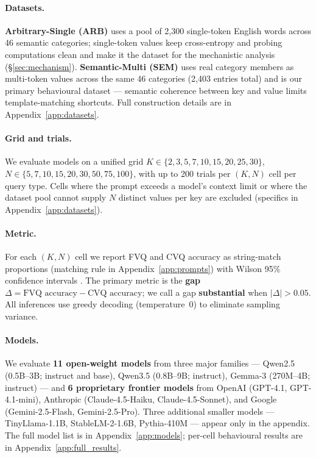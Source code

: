 \documentclass[11pt]{article}
\begin{document}
\paragraph{Datasets.}
\textbf{Arbitrary-Single (ARB)} uses a pool of 2{,}300 single-token
English words across 46 semantic categories;
single-token values keep cross-entropy and probing computations
clean and make it the dataset for the mechanistic analysis
(\S\ref{sec:mechanism}).
\textbf{Semantic-Multi (SEM)} uses real category members as
multi-token values across the same 46 categories (2{,}403 entries
total) and is our primary behavioural dataset --- semantic coherence
between key and value limits template-matching shortcuts.
Full construction details are in Appendix~\ref{app:datasets}.

\paragraph{Grid and trials.}
We evaluate models on a unified grid
$K \in \{2, 3, 5, 7, 10, 15, 20, 25, 30\}$,
$N \in \{5, 7, 10, 15, 20, 30, 50, 75, 100\}$, with up to 200 trials
per $(K, N)$ cell per query type.
Cells where the prompt exceeds a model's context limit or where the
dataset pool cannot supply $N$ distinct values per key are excluded
(specifics in Appendix~\ref{app:datasets}).

\paragraph{Metric.}
For each $(K, N)$ cell we report FVQ and CVQ accuracy as
string-match proportions (matching rule in
Appendix~\ref{app:prompts}) with Wilson 95\% confidence intervals
\citep{wilson1927}.
The primary metric is the \textbf{gap}
$\Delta = \text{FVQ accuracy} - \text{CVQ accuracy}$; we call a gap
\textbf{substantial} when $|\Delta| > 0.05$.
All inferences use greedy decoding (temperature~0) to eliminate
sampling variance.

\paragraph{Models.}
We evaluate \textbf{11 open-weight models} from three major
families --- Qwen2.5 (0.5B--3B; instruct and base), Qwen3.5
(0.8B--9B; instruct), Gemma-3 (270M--4B; instruct) --- and \textbf{6
proprietary frontier models} from OpenAI (GPT-4.1, GPT-4.1-mini),
Anthropic (Claude-4.5-Haiku, Claude-4.5-Sonnet), and Google
(Gemini-2.5-Flash, Gemini-2.5-Pro).
Three additional smaller models --- TinyLlama-1.1B, StableLM-2-1.6B,
Pythia-410M --- appear only in the appendix.
The full model list is in Appendix~\ref{app:models}; per-cell
behavioural results are in Appendix~\ref{app:full_results}.
\end{document}
